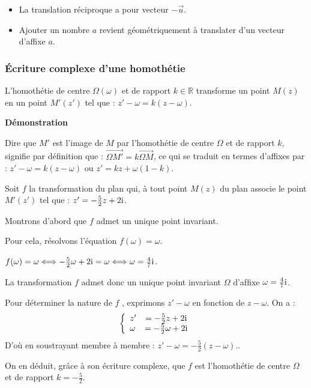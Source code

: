  \begin{remark}
 \begin{itemize}
 \item La translation réciproque a pour vecteur $ - \overrightarrow{u} $.
 \item  Ajouter un nombre $ a $ revient géométriquement à translater d'un vecteur
d'affixe $ a $.
 \end{itemize}
  \end{remark}
 \subsubsection*{Écriture complexe d'une homothétie}
\begin{theorem}
 L'homothétie de centre $ \Omega  (\omega ) $ et de rapport $ k\in\mathbb{R} $ transforme un point  $ M( z )$  en un point $ M'( z ')$  tel que : $ z'-\omega =k(z-\omega) $.
\end{theorem}

\textbf{Démonstration}

\medskip

Dire que $ M' $ est l'image de $ M $ par l'homothétie de centre $ \Omega $ et de rapport $ k $, signifie par définition que : $\overrightarrow{ \Omega M'}= k  \overrightarrow{ \Omega M}$, ce qui se traduit en termes d'affixes par : $ z'-\omega =k (z-\omega) $ ou  $ z'=kz +\omega(1-k) $.

\medskip
\begin{example}
Soit $ f $ la transformation du plan qui, à tout point $M(z)$ du plan associe le point  $M'(z')$ tel que : $ z'=-\frac{5}{2}z+2\text{i} $.

\medskip

Montrons d'abord que $ f $ admet un unique point invariant.

 Pour cela, résolvons l'équation $ f(\omega)=\omega $.

$ f(\omega)=\omega \Longleftrightarrow -\frac{5}{2}\omega+2\text{i}=\omega  \Longleftrightarrow \omega=\frac{4}{7} \text{i}$.

\medskip

La transformation $ f $ admet donc un unique point invariant $ \Omega $ d'afﬁxe $ \omega= \frac{4}{7} \text{i}$.

 Pour déterminer la nature de $ f $ , exprimons  $ z'-\omega $ en fonction de $ z-\omega $. On a :
$$  \left\{\begin{array}{l c l}
z'&=-\frac{5}{2}z+2\i \\ 	 
\omega &=-\frac{5}{2}\omega +2\i\\

\end{array}\right.  $$
D'où en soustrayant membre à membre :  $ z'-\omega =-\frac{5}{2}(z-\omega) $..

On en déduit, grâce à son écriture complexe, que $ f $ est l'homothétie de centre $ \Omega $ et de rapport $ k=-\frac{5}{2} $. 
\end{example}
\medskip

